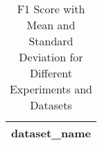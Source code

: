 \begin{table}[ht]
\centering
\caption{F1 Score with Mean and Standard Deviation for Different Experiments and Datasets}
\label{tab:mean_std}
\begin{tabular}{l}
\toprule
dataset_name \\
\midrule
\bottomrule
\end{tabular}
\end{table}